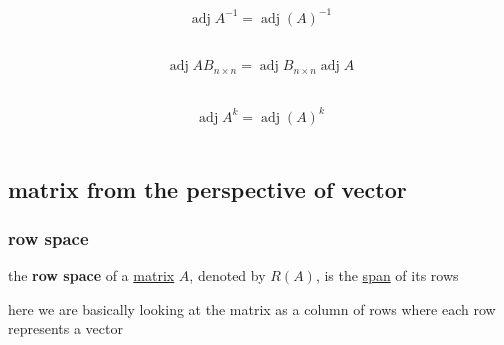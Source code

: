 \documentclass[a4paper,12pt]{article}
\DeclareMathOperator{\adj}{adj}
\begin{document}
\begin{definition}
\begin{characteristic}
\begin{lemma}
\begin{entailment}
\[
  \adj A^{-1} = \adj(A)^{-1}
\]\\
\end{entailment}
\end{lemma}

\begin{lemma}
\[
  \adj AB_{n\times n} = \adj B_{n\times n}\adj A
\]\\
\begin{entailment}
\[
\adj A^k = \adj(A)^k
\]\\
\end{entailment}
\end{lemma}
\end{characteristic}
\end{definition}
\subsection{matrix from the perspective of vector}
\label{sec:org665c542}
\subsubsection{row space}
\label{sec:orged0dce5}
\begin{definition}
the \textbf{row space} of a \hyperref[sec:org2833a15]{matrix} \(A\), denoted by \(R(A)\), is the \hyperref[sec:org1ee137f]{span} of its rows\\

\begin{note}
here we are basically looking at the matrix as a column of rows where each row represents a vector\\
\end{note}

\begin{center}

\end{center}
\end{definition}
\end{document}
